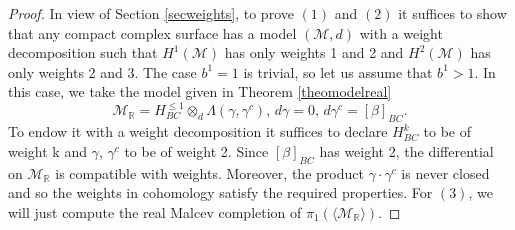 \documentclass[a4paper]{amsart}
\theoremstyle{definition}
\newcommand{\RR}{\mathbb{R}}
\newcommand{\Mm}{\mathcal{M}}
\begin{document}
\begin{proof}
 In view of Section \ref{secweights}, to prove $(1)$ and $(2)$ it suffices to show that any compact complex surface has a model $(\Mm,d)$ with a weight decomposition such that $H^1(\Mm)$ has only weights 1 and 2 and $H^2(\Mm)$ has only weights 2 and 3.
The case $b^1=1$ is trivial, so let us assume that $b^1>1$. In this case, we take the model given in Theorem \ref{theomodelreal}
\[\Mm_\RR=H^{\leq 1}_{BC}\otimes_d\Lambda(\gamma,\gamma^c),\, d\gamma=0,\,d\gamma^c=[\beta]_{BC}.\]
To endow it with a weight decomposition it suffices to declare $H_{BC}^k$ to be of weight k and $\gamma$, $\gamma^c$ to be of weight 2.
Since $[\beta]_{BC}$ has weight 2, the differential on $\Mm_\RR$ is compatible with weights.
Moreover, the product $\gamma\cdot\gamma^c$ is never closed and so the weights in cohomology satisfy the required properties.
For $(3)$, we will just compute the real Malcev completion of $\pi_1(\langle \Mm_\RR\rangle)$.


\end{proof}
\end{document}
